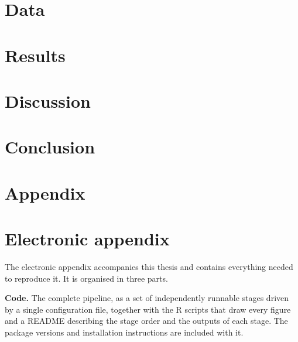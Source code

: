\documentclass[12pt]{article}
\begin{document}
\section{Data}
\label{data}

\newpage

\section{Results}
\label{results}

\newpage

\section{Discussion}
\label{discussion}

\newpage

\section{Conclusion}
\label{conclusion}


\newpage



\setcounter{page}{5} %

\appendix

\section{Appendix}
\label{app}

\newpage

\section{Electronic appendix}
\label{el_app}

The electronic appendix accompanies this thesis and contains everything needed to reproduce it. It is
organised in three parts.

\textbf{Code.} The complete pipeline, as a set of independently runnable stages driven by a single
configuration file, together with the R scripts that draw every figure and a README
describing the stage order and the outputs of each stage. The package versions and installation instructions
are included with it.
\end{document}
